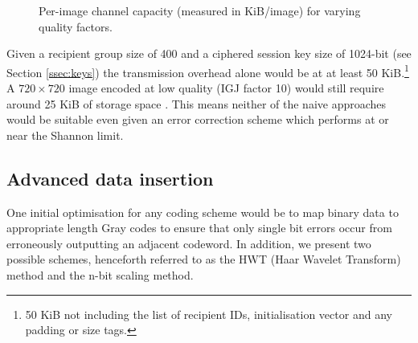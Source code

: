 \begin{figure}[tbp]
  \begin{center}
    \caption{Per-image channel capacity (measured in KiB/image) for varying quality factors.}
    \label{graph:capacity0}
  \end{center}
\end{figure}

Given a recipient group size of 400 and a ciphered session key size of 1024-bit (see Section \ref{ssec:keys}) the transmission overhead alone would be at at least 50 KiB.\footnote{50 KiB not including the list of recipient IDs, initialisation vector and any padding or size tags.} A $720 \times 720$ image encoded at low quality (IGJ factor 10) would still require around 25 KiB of storage space \cite{ijg}. This means neither of the naive approaches would be suitable even given an error correction scheme which performs at or near the Shannon limit. 


\subsection{Advanced data insertion}

One initial optimisation for any coding scheme would be to map binary data to appropriate length Gray codes to ensure that only single bit errors occur from erroneously outputting an adjacent codeword. In addition, we present two possible schemes, henceforth referred to as the HWT (Haar Wavelet Transform) method and the n-bit scaling method.

